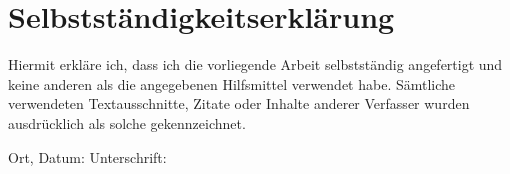 \newpage
\section*{Selbstständigkeitserklärung}
Hiermit erkläre ich, dass ich die vorliegende Arbeit selbstständig angefertigt und keine anderen als die
angegebenen Hilfsmittel verwendet habe. Sämtliche verwendeten Textausschnitte, Zitate oder Inhalte anderer Verfasser wurden ausdrücklich als solche gekennzeichnet.\\
\vspace{40pt}

Ort, Datum: \hspace{8cm} Unterschrift:


\newpage